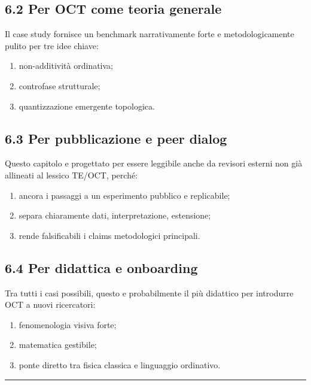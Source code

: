 \subsection{6.2 Per OCT come teoria generale}

Il case study fornisce un benchmark narrativamente forte e metodologicamente pulito per tre idee chiave:

\begin{enumerate}
\def\labelenumi{\arabic{enumi}.}
\tightlist
\item
  non-additività ordinativa;
\item
  controfase strutturale;
\item
  quantizzazione emergente topologica.
\end{enumerate}

\subsection{6.3 Per pubblicazione e peer dialog}

Questo capitolo e progettato per essere leggibile anche da revisori esterni non già allineati al lessico TE/OCT, perché:

\begin{enumerate}
\def\labelenumi{\arabic{enumi}.}
\tightlist
\item
  ancora i passaggi a un esperimento pubblico e replicabile;
\item
  separa chiaramente dati, interpretazione, estensione;
\item
  rende falsificabili i claims metodologici principali.
\end{enumerate}

\subsection{6.4 Per didattica e onboarding}

Tra tutti i casi possibili, questo e probabilmente il più didattico per introdurre OCT a nuovi ricercatori:

\begin{enumerate}
\def\labelenumi{\arabic{enumi}.}
\tightlist
\item
  fenomenologia visiva forte;
\item
  matematica gestibile;
\item
  ponte diretto tra fisica classica e linguaggio ordinativo.
\end{enumerate}

\begin{center}\rule{0.5\linewidth}{0.5pt}\end{center}

